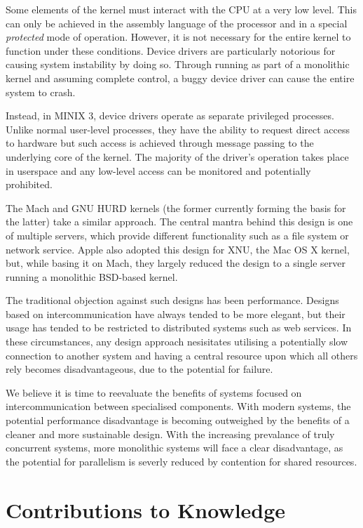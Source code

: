 Some elements of the kernel must interact with the CPU at a very low
level.  This can only be achieved in the assembly language of the
processor and in a special \emph{protected} mode of operation.
However, it is not necessary for the entire kernel to function under
these conditions.  Device drivers are particularly notorious for
causing system instability by doing so.  Through running as part of a
monolithic kernel and assuming complete control, a buggy device driver
can cause the entire system to crash.

Instead, in MINIX 3, device drivers operate as separate privileged
processes.  Unlike normal user-level processes, they have the ability
to request direct access to hardware but such access is achieved
through message passing to the underlying core of the kernel.  The
majority of the driver's operation takes place in userspace and any
low-level access can be monitored and potentially prohibited.

The Mach and GNU HURD kernels (the former currently
\cite{hurd:critique} forming the basis for the latter) take a similar
approach.  The central mantra behind this design is one of multiple
servers, which provide different functionality such as a file system
or network service.  Apple also adopted this design for XNU, the Mac
OS X kernel, but, while basing it on Mach, they largely reduced the
design to a single server running a monolithic BSD-based kernel.

The traditional objection against such designs has been performance.
Designs based on intercommunication have always tended to be more
elegant, but their usage has tended to be restricted to distributed
systems such as web services.  In these circumstances, any design
approach nesisitates utilising a potentially slow connection to
another system and having a central resource upon which all others
rely becomes disadvantageous, due to the potential for failure.

We believe it is time to reevaluate the benefits of systems focused on
intercommunication between specialised components.  With modern
systems, the potential performance disadvantage is becoming outweighed
by the benefits of a cleaner and more sustainable design.  With the
increasing prevalance of truly concurrent systems, more monolithic
systems will face a clear disadvantage, as the potential for
parallelism is severly reduced by contention for shared resources.

\section{Contributions to Knowledge}

